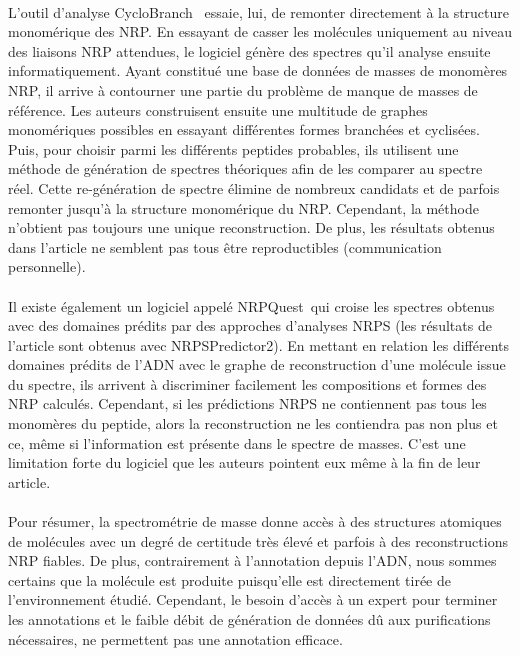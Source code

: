 \documentclass[12pt,french,twoside]{report}
\begin{document}
\paragraph{}L'outil d'analyse CycloBranch~\cite{novak_cyclobranch:_2015} essaie, lui, de remonter directement à la structure monomérique des NRP.
En essayant de casser les molécules uniquement au niveau des liaisons NRP attendues, le logiciel génère des spectres qu'il analyse ensuite informatiquement.
Ayant constitué une base de données de masses de monomères NRP, il arrive à contourner une partie du problème de manque de masses de référence.
Les auteurs construisent ensuite une multitude de graphes monomériques possibles en essayant différentes formes branchées et cyclisées.
Puis, pour choisir parmi les différents peptides probables, ils utilisent une méthode de génération de spectres théoriques afin de les comparer au spectre réel.
Cette re-génération de spectre élimine de nombreux candidats et de parfois remonter jusqu'à la structure monomérique du NRP.
Cependant, la méthode n'obtient pas toujours une unique reconstruction.
De plus, les résultats obtenus dans l'article ne semblent pas tous être reproductibles (communication personnelle).

\paragraph{}Il existe également un logiciel appelé NRPQuest~\cite{mohimani_nrpquest:_2014}qui croise les spectres obtenus avec des domaines prédits par des approches d'analyses NRPS (les résultats de l'article sont obtenus avec NRPSPredictor2).
En mettant en relation les différents domaines prédits de l'ADN avec le graphe de reconstruction d'une molécule issue du spectre, ils arrivent à discriminer facilement les compositions et formes des NRP calculés.
Cependant, si les prédictions NRPS ne contiennent pas tous les monomères du peptide, alors la reconstruction ne les contiendra pas non plus et ce, même si l'information est présente dans le spectre de masses.
C'est une limitation forte du logiciel que les auteurs pointent eux même à la fin de leur article.

\paragraph{}Pour résumer, la spectrométrie de masse donne accès à des structures atomiques de molécules avec un degré de certitude très élevé et parfois à des reconstructions NRP fiables.
De plus, contrairement à l'annotation depuis l'ADN, nous sommes certains que la molécule est produite puisqu'elle est directement tirée de l'environnement étudié.
Cependant, le besoin d'accès à un expert pour terminer les annotations et le faible débit de génération de données dû aux purifications nécessaires, ne permettent pas une annotation efficace.
\end{document}
